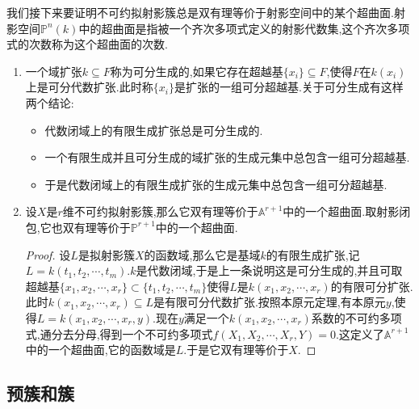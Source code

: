我们接下来要证明不可约拟射影簇总是双有理等价于射影空间中的某个超曲面.射影空间$\mathbb{P}^n(k)$中的超曲面是指被一个齐次多项式定义的射影代数集,这个齐次多项式的次数称为这个超曲面的次数.
\begin{enumerate}
	\item 一个域扩张$k\subseteq F$称为可分生成的,如果它存在超越基$\{x_i\}\subseteq F$,使得$F$在$k(x_i)$上是可分代数扩张.此时称$\{x_i\}$是扩张的一组可分超越基.关于可分生成有这样两个结论:
	\begin{itemize}
		\item 代数闭域上的有限生成扩张总是可分生成的.
		\item 一个有限生成并且可分生成的域扩张的生成元集中总包含一组可分超越基.
		\item 于是代数闭域上的有限生成扩张的生成元集中总包含一组可分超越基.
	\end{itemize}
	\item 设$X$是$r$维不可约拟射影簇,那么它双有理等价于$\mathbb{A}^{r+1}$中的一个超曲面.取射影闭包,它也双有理等价于$\mathbb{P}^{r+1}$中的一个超曲面.
	\begin{proof}
		
		设$L$是拟射影簇$X$的函数域,那么它是基域$k$的有限生成扩张,记$L=k(t_1,t_2,\cdots,t_m)$.$k$是代数闭域,于是上一条说明这是可分生成的,并且可取超越基$\{x_1,x_2,\cdots,x_r\}\subset\{t_1,t_2,\cdots,t_m\}$使得$L$是$k(x_1,x_2,\cdots,x_r)$的有限可分扩张.此时$k(x_1,x_2,\cdots,x_r)\subseteq L$是有限可分代数扩张.按照本原元定理,有本原元$y$,使得$L=k(x_1,x_2,\cdots,x_r,y)$.现在$y$满足一个$k(x_1,x_2,\cdots,x_r)$系数的不可约多项式,通分去分母,得到一个不可约多项式$f(X_1,X_2,\cdots,X_r,Y)=0$.这定义了$\mathbb{A}^{r+1}$中的一个超曲面,它的函数域是$L$.于是它双有理等价于$X$.
	\end{proof}
\end{enumerate}
\subsection{预簇和簇}

